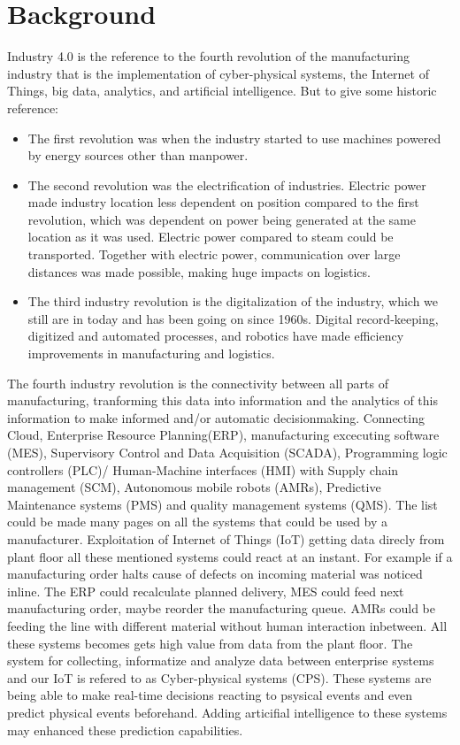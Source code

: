 \documentclass[article,a4paper]{IEEEtran}
\begin{document}
    \section{Background}
    Industry 4.0 is the reference to the fourth revolution of the manufacturing industry that is the implementation of cyber-physical systems, the Internet of Things, big data, analytics, and artificial intelligence. But to give some historic reference: 
    \begin{itemize}
        \item The first revolution was when the industry started to use machines powered by energy sources other than manpower.
        \item The second revolution was the electrification of industries. Electric power made industry location less dependent on position compared to the first revolution, which was dependent on power being generated at the same location as it was used. Electric power compared to steam could be transported. Together with electric power, communication over large distances was made possible, making huge impacts on logistics.
        \item The third industry revolution is the digitalization of the industry, which we still are in today and has been going on since 1960s. Digital record-keeping, digitized and automated processes, and robotics have made efficiency improvements in manufacturing and logistics.
    \end{itemize}
    The fourth industry revolution is the connectivity between all parts of manufacturing, tranforming this data into information and the analytics of this information to make informed and/or automatic decisionmaking. Connecting Cloud, Enterprise Resource Planning(ERP), manufacturing excecuting software (MES), Supervisory Control and Data Acquisition (SCADA), Programming logic controllers (PLC)/ Human-Machine interfaces (HMI) \cite{industry4.0} with Supply chain management (SCM), Autonomous mobile robots (AMRs), Predictive Maintenance systems (PMS) and quality management systems (QMS). The list could be made many pages on all the systems that could be used by a manufacturer.
    \newline\newline
    Exploitation of Internet of Things (IoT) getting data direcly from plant floor all these mentioned systems could react at an instant. For example if a manufacturing order halts cause of defects on incoming material was noticed inline. The ERP could recalculate planned delivery, MES could feed next manufacturing order, maybe reorder the manufacturing queue. AMRs could be feeding the line with different material without human interaction inbetween. All these systems becomes gets high value from data from the plant floor. The system for collecting, informatize and analyze data between enterprise systems and our IoT is refered to as Cyber-physical systems (CPS). These systems are being able to make real-time decisions reacting to psysical events and even predict physical events beforehand. Adding articifial intelligence to these systems may enhanced these prediction capabilities.
\end{document}
